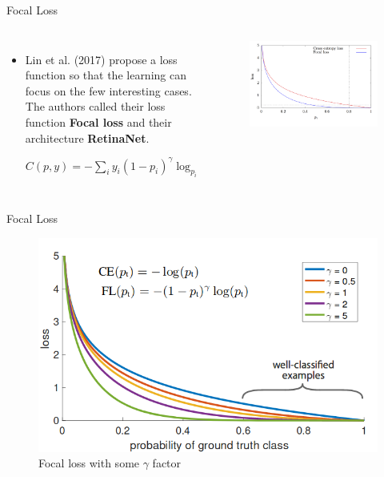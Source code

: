 \documentclass[aspectratio=169]{beamer}
\begin{document}
\begin{frame}{Focal Loss}
\begin{columns}[T, c, textwidth]
\begin{itemize}
    \item Lin et al. (2017) propose a loss function so that the learning can focus on the few interesting cases. The authors called their loss function \textbf{Focal loss} and their architecture \textbf{RetinaNet}.
    
    $C(p, y) = -\sum_{i} y_{i} (1-p_{i})^{\gamma} \log_{p_{i}}$
\end{itemize}
\begin{figure}
    \centering
    \includegraphics[scale=.2]{demo/figs/fcl4.png}
\end{figure}
\end{columns}
\end{frame}


\begin{frame}{Focal Loss}
\begin{figure}
    \centering
    \includegraphics[scale=.3]{demo/figs/fcl5.png}
    \caption{Focal loss with some $\gamma$ factor}
\end{figure}
\end{frame}
\end{document}
